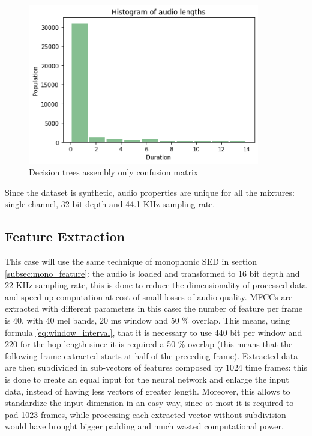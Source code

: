 \documentclass{article}
\begin{document}
\begin{figure}[H]
	\centering
	\includegraphics[width=0.9\textwidth]{./images/poly/duration.png}	
	\caption{Decision trees assembly only confusion matrix}
	\label{fig:poly_duration}
\end{figure}

Since the dataset is synthetic, audio properties are unique for all the mixtures: single channel, 32 bit depth and 44.1 KHz sampling rate.

\subsection{Feature Extraction}
\label{subsec:poly_feature}

This case will use the same technique of monophonic SED in section \ref{subsec:mono_feature}: the audio is loaded and transformed to 16 bit depth and 22 KHz sampling rate, this is done to reduce the dimensionality of processed data and speed up computation at cost of small losses of audio quality.\newline
MFCCs are extracted with different parameters in this case: the number of feature per frame is 40, with 40 mel bands, 20 ms window and 50 \% overlap. This means, using formula \ref{eq:window_interval}, that it is necessary to use 440 bit per window and 220 for the hop length since it is required a 50 \% overlap (this means that the following frame extracted starts at half of the preceding frame).\newline
Extracted data are then subdivided in sub-vectors of features composed by 1024 time frames: this is done to create an equal input for the neural network and enlarge the input data, instead of having less vectors of greater length. Moreover, this allows to standardize the input dimension in an easy way, since at most it is required to pad 1023 frames, while processing each extracted vector without subdivision would have brought bigger padding and much wasted computational power.
\end{document}
